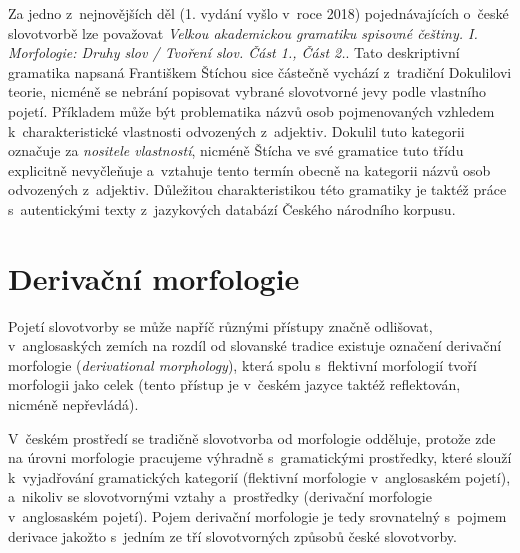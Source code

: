 Za jedno z~nejnovějších děl (1. vydání vyšlo v~roce 2018)
pojednávajících o~české slovotvorbě lze považovat \emph{Velkou
akademickou gramatiku spisovné češtiny. I. Morfologie: Druhy slov /
Tvoření slov. Část 1., Část 2.}. Tato deskriptivní gramatika napsaná
Františkem Štíchou sice částečně vychází z~tradiční Dokulilovi teorie,
nicméně se nebrání popisovat vybrané slovotvorné jevy podle vlastního
pojetí. Příkladem může být problematika názvů osob pojmenovaných
vzhledem k~charakteristické vlastnosti odvozených z~adjektiv. Dokulil
tuto kategorii označuje za \emph{nositele vlastností}, nicméně Štícha ve
své gramatice tuto třídu explicitně nevyčleňuje a~vztahuje tento termín
obecně na kategorii názvů osob odvozených z~adjektiv. Důležitou
charakteristikou této gramatiky je taktéž práce s~autentickými texty
z~jazykových databází Českého národního korpusu.~\parencite{sticha18}

\hypertarget{derivaux10dnuxed-morfologie}{%
\section{Derivační morfologie}\label{derivaux10dnuxed-morfologie}}

Pojetí slovotvorby se může napříč různými přístupy značně odlišovat,
v~anglosaských zemích na rozdíl od slovanské tradice existuje označení
derivační morfologie (\emph{derivational morphology}), která spolu
s~flektivní morfologií tvoří morfologii jako celek (tento přístup je
v~českém jazyce taktéž reflektován, nicméně nepřevládá).
\parencite{lieber14}

V~českém prostředí se tradičně slovotvorba od morfologie odděluje,
protože zde na úrovni morfologie pracujeme výhradně s~gramatickými
prostředky, které slouží k~vyjadřování gramatických kategorií (flektivní
morfologie v~anglosaském pojetí), a~nikoliv se slovotvornými vztahy
a~prostředky (derivační morfologie v~anglosaském pojetí). Pojem derivační
morfologie je tedy srovnatelný s~pojmem derivace jakožto s~jedním ze tří
slovotvorných způsobů české slovotvorby.
